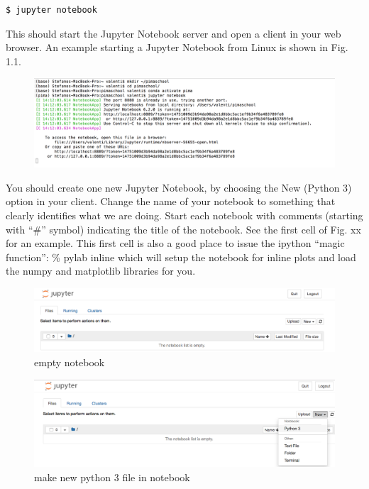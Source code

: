 \documentclass[11pt]{book}
\begin{document}
\begin{lstlisting}[language=bash]
$ jupyter notebook
\end{lstlisting}

This should start the Jupyter Notebook server and open a client in your web browser.  An example starting a Jupyter Notebook from Linux is shown in Fig. 1.1.

\begin{figure}[!]
\includegraphics[scale=.6]{figures/start_jupyter.png}
\end{figure}

You should create one new Jupyter Notebook, by choosing the New (Python 3) option in your client.  Change the name of your notebook to something that clearly identifies what we are doing.  Start each notebook with comments (starting with “\#” symbol) indicating the title of the notebook.  See the first cell of Fig. xx for an example.  This first cell is also a good place to issue the ipython “magic function”: \%{} pylab inline which will setup the notebook for inline plots and load the numpy and matplotlib libraries for you.

\begin{figure}[!]
\includegraphics[scale=.45]{figures/notebook.png}
\caption{empty notebook}
\end{figure}

\begin{figure}[!]
\includegraphics[scale=.45]{figures/notebook_create_file.png}
\caption{make new python 3 file in notebook}
\end{figure}
\end{document}
